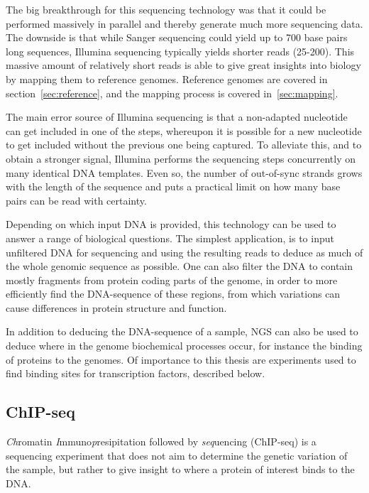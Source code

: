 The big breakthrough for this sequencing technology was that it could be performed massively in parallel and thereby generate much more sequencing data.
The downside is that while Sanger sequencing could yield up to 700 base pairs long sequences, Illumina sequencing typically yields shorter reads (25-200).
This massive amount of relatively short reads is able to give great insights into biology by mapping them to reference genomes. Reference genomes are covered in section~\ref{sec:reference}, and the mapping process is covered in~\ref{sec:mapping}.

The main error source of Illumina sequencing is that a non-adapted nucleotide can get included in one of the steps, whereupon it is possible for a new nucleotide to get included without the previous one being captured.
To alleviate this, and to obtain a stronger signal, Illumina performs the sequencing steps concurrently on many identical DNA templates. Even so, the number of out-of-sync strands grows with the length of the sequence and puts a practical limit on how many base pairs can be read with certainty.

Depending on which input DNA is provided, this technology can be used to answer a range of biological questions.
The simplest application, is to input unfiltered DNA for sequencing and using the resulting reads to deduce as much of the whole genomic sequence as possible. One can also filter the DNA to contain mostly fragments from protein coding parts of the genome, in order to more efficiently find the DNA-sequence of these regions, from which variations can cause differences in protein structure and function.

In addition to deducing the DNA-sequence of a sample, NGS can also be used to deduce where in the genome biochemical processes occur, for instance the binding of proteins to the genomes. Of importance to this thesis are experiments used to find binding sites for transcription factors, described below.

\subsection{ChIP-seq}
\emph{Ch}romatin \emph{I}mmuno\emph{p}resipitation  followed by \emph{seq}uencing (ChIP-seq) is a sequencing experiment that does not aim to determine the genetic variation of the sample, but rather to give insight to where a protein of interest binds to the DNA.

